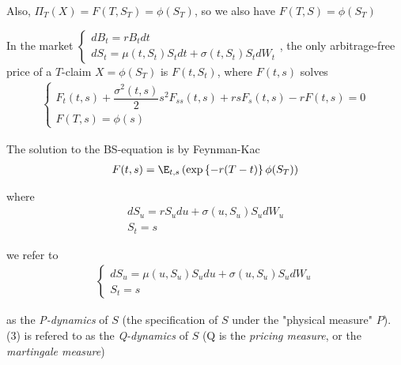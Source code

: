 \noindent Also, $\Pi_T(X) = F(T,S_T) = \phi(S_T)$, so we also have $F(T,S) =\phi(S_T)$
\par\bigskip
\begin{theo}{}
  In the market $\begin{cases}
    dB_t = rB_t dt\\
    dS_t = \mu(t,S_t)S_tdt + \sigma(t,S_t)S_tdW_t
  \end{cases}$, the only arbitrage-free price of a $T$-claim $X = \phi(S_T)$ is $F(t,S_t)$, where $F(t,s)$ solves
  \begin{equation*}
    \begin{gathered}
      \begin{cases}
        F_t(t,s)+\dfrac{\sigma^2(t,s)}{2}s^2F_{ss}(t,s)+rsF_s(t,s)-rF(t,s) =0\\
        F(T,s) = \phi(s)
      \end{cases}
    \end{gathered}
  \end{equation*}
\end{theo}
\par\bigskip
\noindent The solution to the BS-equation is by Feynman-Kac
\begin{equation*}
  \begin{gathered}
    F(t,s) = \E_{t,s}\left(\text{exp}\left\{-r(T-t)\right\}\phi(S_T)\right)
  \end{gathered}
\end{equation*}\par
\noindent where 
\begin{equation}
  \begin{gathered}
    dS_u = rS_udu+\sigma(u,S_u)S_udW_u\\
    S_t = s
  \end{gathered}
\end{equation}\par
\noindent we refer to 
\begin{equation}
  \begin{gathered}
    \begin{cases}
      dS_u = \mu(u,S_u)S_u du+\sigma(u,S_u)S_udW_u\\
      S_t = s
    \end{cases}
  \end{gathered}
\end{equation}\par
\noindent as the \textit{P-dynamics} of $S$ (the specification of $S$ under the "physical measure" $P$). (3) is refered to as the \textit{Q-dynamics} of $S$ (Q is the \textit{pricing measure}, or the \textit{martingale measure})
